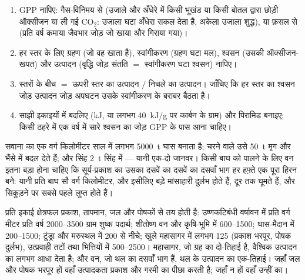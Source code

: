 \begin{method}[कोई ऊर्जा-बजट बनाना]\label{met:b1:ecosystem-organization:budget}
\begin{enumerate}
  \item GPP नापिए: गैस-विनिमय से (उजाले और अँधेरे में किसी भूखंड या
        किसी बोतल द्वारा छोड़ी ऑक्सीजन या ली गई $\mathrm{CO_2}$:
        उजाला घटा अँधेरा सकल देता है, अकेला उजाला शुद्ध), या फ़सल से
        (प्रति वर्ष कमाया जैवभार जोड़ जो खाया और गिराया गया)।
  \item हर  स्तर के लिए ग्रहण (जो वह खाता है), स्वांगीकरण
        (ग्रहण घटा मल), श्वसन (उसकी ऑक्सीजन-खपत) और उत्पादन (वृद्धि
        जोड़ संतति $=$ स्वांगीकरण घटा श्वसन) नापिए।
  \item स्तरों के बीच  $=$ ऊपरी स्तर का उत्पादन
        $/$ निचले का उत्पादन। जाँचिए कि हर स्तर का श्वसन जोड़ उत्पादन
        जोड़ अपघटन उसके स्वांगीकरण के बराबर बैठता है।
  \item साझी इकाइयों में बदलिए (\unit{kJ}, या लगभग \qty{40}{kJ/g} पर
        कार्बन के ग्राम) और पिरामिड बनाइए; किसी ठहरे  में एक
        वर्ष में सारे श्वसन का जोड़ GPP के पास आना चाहिए।
\end{enumerate}
\end{method}

\begin{example}[चोटी पतली क्यों है]\label{ex:b1:ecosystem-organization:top}
सवाना का एक वर्ग किलोमीटर साल में लगभग \qty{5000}{t} घास बनाता है;
चरने वाले उसे \qty{50}{t} मृग और भैंसे में बदल देते हैं; और सिंह
\qty{2}{t} सिंह में --- यानी एक-दो जानवर। किसी बाघ को पालने के लिए वन
इतना बड़ा होना चाहिए कि सूर्य-प्रकाश का उसका दसवें का दसवें का दसवाँ भाग
हर हफ़्ते एक पूरा हिरन बने: यानी प्रति बाघ सौ वर्ग किलोमीटर, और इसीलिए
बड़े मांसाहारी दुर्लभ होते हैं, दूर तक घूमते हैं, और  सिकुड़ने पर
सबसे पहले लुप्त होते हैं।
\end{example}

\begin{proposition}[जीवोमों की उत्पादकता]\label{prop:b1:ecosystem-organization:biomes}
प्रति इकाई क्षेत्रफल  प्रकाश, तापमान, जल और
पोषकों से तय होती है: उष्णकटिबंधी वर्षावन में प्रति वर्ग मीटर प्रति वर्ष
\qtyrange{2000}{3500}{} ग्राम शुष्क पदार्थ; शीतोष्ण वन और कृषि-भूमि में
\qtyrange{600}{1500}{}; घास-मैदान में \qtyrange{200}{1500}{}; टुंड्रा
और मरुस्थल में \qty{200}{} से नीचे; खुले महासागर में लगभग \qty{125}{}
(प्रकाश भरपूर, पोषक दुर्लभ), उत्प्रवाही तटों तथा भित्तियों में
\qtyrange{500}{2500}{}।
महासागर, जो ग्रह का दो-तिहाई है, वैश्विक उत्पादन का लगभग आधा देता है;
और वन, जो थल का दसवाँ भाग हैं, थल के उत्पादन का एक-तिहाई। जहाँ जल और
पोषक भरपूर हों वहाँ उत्पादकता प्रकाश और गरमी का पीछा करती है; जहाँ न हों
वहाँ उन्हीं का।
\end{proposition}

